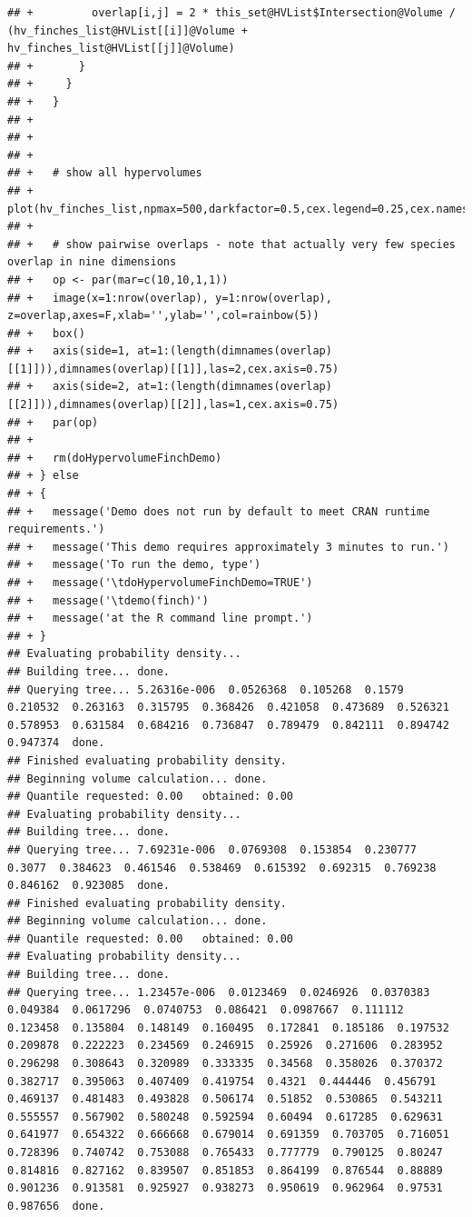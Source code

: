 \documentclass[12pt]{article}\usepackage[]{graphicx}\usepackage[]{color}
\makeatletter
\newenvironment{kframe}{%
 \def\at@end@of@kframe{}%
 \ifinner\ifhmode%
  \def\at@end@of@kframe{\end{minipage}}%
  \begin{minipage}{\columnwidth}%
 \fi\fi%
 \def\FrameCommand##1{\hskip\@totalleftmargin \hskip-\fboxsep
 \colorbox{shadecolor}{##1}\hskip-\fboxsep
     \hskip-\linewidth \hskip-\@totalleftmargin \hskip\columnwidth}%
 \MakeFramed {\advance\hsize-\width
   \@totalleftmargin\z@ \linewidth\hsize
   \@setminipage}}%
 {\par\unskip\endMakeFramed%
 \at@end@of@kframe}
\newenvironment{knitrout}{}{} %
\makeatother
\begin{document}
\begin{knitrout}
\begin{kframe}
\begin{verbatim}
## +         overlap[i,j] = 2 * this_set@HVList$Intersection@Volume / (hv_finches_list@HVList[[i]]@Volume + hv_finches_list@HVList[[j]]@Volume)
## +       }
## +     }   
## +   }
## +   
## + 
## +   
## +   # show all hypervolumes
## +   plot(hv_finches_list,npmax=500,darkfactor=0.5,cex.legend=0.25,cex.names=0.75)
## +   
## +   # show pairwise overlaps - note that actually very few species overlap in nine dimensions
## +   op <- par(mar=c(10,10,1,1))
## +   image(x=1:nrow(overlap), y=1:nrow(overlap), z=overlap,axes=F,xlab='',ylab='',col=rainbow(5))
## +   box()
## +   axis(side=1, at=1:(length(dimnames(overlap)[[1]])),dimnames(overlap)[[1]],las=2,cex.axis=0.75)
## +   axis(side=2, at=1:(length(dimnames(overlap)[[2]])),dimnames(overlap)[[2]],las=1,cex.axis=0.75)
## +   par(op)
## +   
## +   rm(doHypervolumeFinchDemo)
## + } else
## + {
## +   message('Demo does not run by default to meet CRAN runtime requirements.')
## +   message('This demo requires approximately 3 minutes to run.')  
## +   message('To run the demo, type')
## +   message('\tdoHypervolumeFinchDemo=TRUE')
## +   message('\tdemo(finch)')
## +   message('at the R command line prompt.')
## + }
## Evaluating probability density...
## Building tree... done.
## Querying tree... 5.26316e-006  0.0526368  0.105268  0.1579  0.210532  0.263163  0.315795  0.368426  0.421058  0.473689  0.526321  0.578953  0.631584  0.684216  0.736847  0.789479  0.842111  0.894742  0.947374  done.
## Finished evaluating probability density.
## Beginning volume calculation... done. 
## Quantile requested: 0.00   obtained: 0.00
## Evaluating probability density...
## Building tree... done.
## Querying tree... 7.69231e-006  0.0769308  0.153854  0.230777  0.3077  0.384623  0.461546  0.538469  0.615392  0.692315  0.769238  0.846162  0.923085  done.
## Finished evaluating probability density.
## Beginning volume calculation... done. 
## Quantile requested: 0.00   obtained: 0.00
## Evaluating probability density...
## Building tree... done.
## Querying tree... 1.23457e-006  0.0123469  0.0246926  0.0370383  0.049384  0.0617296  0.0740753  0.086421  0.0987667  0.111112  0.123458  0.135804  0.148149  0.160495  0.172841  0.185186  0.197532  0.209878  0.222223  0.234569  0.246915  0.25926  0.271606  0.283952  0.296298  0.308643  0.320989  0.333335  0.34568  0.358026  0.370372  0.382717  0.395063  0.407409  0.419754  0.4321  0.444446  0.456791  0.469137  0.481483  0.493828  0.506174  0.51852  0.530865  0.543211  0.555557  0.567902  0.580248  0.592594  0.60494  0.617285  0.629631  0.641977  0.654322  0.666668  0.679014  0.691359  0.703705  0.716051  0.728396  0.740742  0.753088  0.765433  0.777779  0.790125  0.80247  0.814816  0.827162  0.839507  0.851853  0.864199  0.876544  0.88889  0.901236  0.913581  0.925927  0.938273  0.950619  0.962964  0.97531  0.987656  done.

\end{verbatim}
\end{kframe}
\end{knitrout}
\end{document}
